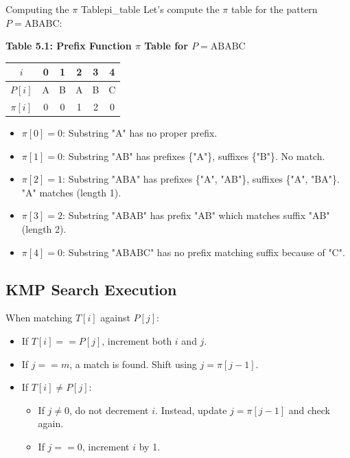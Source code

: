 \documentclass[11pt,a4paper]{article}
\begin{document}
\begin{example}{Computing the $\pi$ Table}{pi_table}
  Let's compute the $\pi$ table for the pattern $P = \text{ABABC}$:
  \begin{center}
    \textbf{Table 5.1: Prefix Function $\pi$ Table for $P = \text{ABABC}$} \\[0.5em]
    \begin{tabular}{cccccc}
      \toprule
      $i$      & 0 & 1 & 2 & 3 & 4 \\ \midrule
      $P[i]$   & A & B & A & B & C \\
      $\pi[i]$ & 0 & 0 & 1 & 2 & 0 \\ \bottomrule
    \end{tabular}
  \end{center}
  \begin{itemize}
    \item $\pi[0] = 0$: Substring "A" has no proper prefix.
    \item $\pi[1] = 0$: Substring "AB" has prefixes \{"A"\}, suffixes \{"B"\}. No match.
    \item $\pi[2] = 1$: Substring "ABA" has prefixes \{"A", "AB"\}, suffixes \{"A", "BA"\}. "A" matches (length 1).
    \item $\pi[3] = 2$: Substring "ABAB" has prefix "AB" which matches suffix "AB" (length 2).
    \item $\pi[4] = 0$: Substring "ABABC" has no prefix matching suffix because of "C".
  \end{itemize}
\end{example}

\subsection{KMP Search Execution}
When matching $T[i]$ against $P[j]$:
\begin{itemize}
  \item If $T[i] == P[j]$, increment both $i$ and $j$.
  \item If $j == m$, a match is found. Shift using $j = \pi[j-1]$.
  \item If $T[i] \neq P[j]$:
  \begin{itemize}
    \item If $j \neq 0$, do not decrement $i$. Instead, update $j = \pi[j-1]$ and check again.
    \item If $j == 0$, increment $i$ by 1.
  \end{itemize}
\end{itemize}
\end{document}
